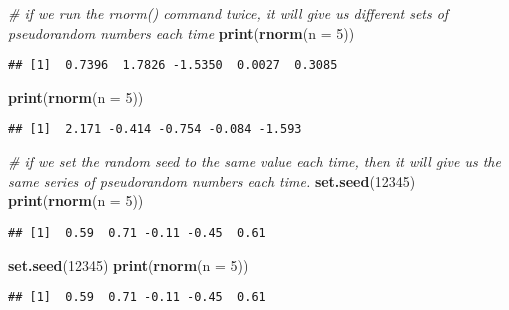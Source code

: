 \documentclass[]{book}
\newenvironment{Shaded}{\begin{snugshade}}{\end{snugshade}}
\newcommand{\KeywordTok}[1]{\textcolor[rgb]{0.13,0.29,0.53}{\textbf{#1}}}
\newcommand{\DataTypeTok}[1]{\textcolor[rgb]{0.13,0.29,0.53}{#1}}
\newcommand{\DecValTok}[1]{\textcolor[rgb]{0.00,0.00,0.81}{#1}}
\newcommand{\CommentTok}[1]{\textcolor[rgb]{0.56,0.35,0.01}{\textit{#1}}}
\newcommand{\NormalTok}[1]{#1}
\theoremstyle{definition}
\theoremstyle{definition}
\theoremstyle{definition}
\theoremstyle{remark}
\begin{document}
\begin{Shaded}
\begin{Highlighting}[]
\CommentTok{# if we run the rnorm() command twice, it will give us different sets of pseudorandom numbers each time}
\KeywordTok{print}\NormalTok{(}\KeywordTok{rnorm}\NormalTok{(}\DataTypeTok{n =} \DecValTok{5}\NormalTok{))}
\end{Highlighting}
\end{Shaded}

\begin{verbatim}
## [1]  0.7396  1.7826 -1.5350  0.0027  0.3085
\end{verbatim}

\begin{Shaded}
\begin{Highlighting}[]
\KeywordTok{print}\NormalTok{(}\KeywordTok{rnorm}\NormalTok{(}\DataTypeTok{n =} \DecValTok{5}\NormalTok{))}
\end{Highlighting}
\end{Shaded}

\begin{verbatim}
## [1]  2.171 -0.414 -0.754 -0.084 -1.593
\end{verbatim}

\begin{Shaded}
\begin{Highlighting}[]
\CommentTok{# if we set the random seed to the same value each time, then it will give us the same series of pseudorandom numbers each time.}
\KeywordTok{set.seed}\NormalTok{(}\DecValTok{12345}\NormalTok{)}
\KeywordTok{print}\NormalTok{(}\KeywordTok{rnorm}\NormalTok{(}\DataTypeTok{n =} \DecValTok{5}\NormalTok{))}
\end{Highlighting}
\end{Shaded}

\begin{verbatim}
## [1]  0.59  0.71 -0.11 -0.45  0.61
\end{verbatim}

\begin{Shaded}
\begin{Highlighting}[]
\KeywordTok{set.seed}\NormalTok{(}\DecValTok{12345}\NormalTok{)}
\KeywordTok{print}\NormalTok{(}\KeywordTok{rnorm}\NormalTok{(}\DataTypeTok{n =} \DecValTok{5}\NormalTok{))}
\end{Highlighting}
\end{Shaded}

\begin{verbatim}
## [1]  0.59  0.71 -0.11 -0.45  0.61
\end{verbatim}
\end{document}
